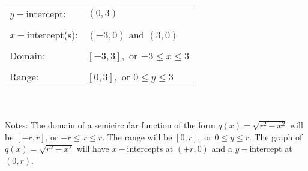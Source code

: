 \documentclass[12pt]{book}
\theoremstyle{definition}
\begin{document}
\vspace{0.5in}
\begin{tabular}{ll}
$y-$intercept: & $(0,3)$\\
&\\
$x-$intercept(s): & $(-3,0)$ and $(3,0)$\\
&\\
Domain: & $[-3,3],$ or $-3\leq x\leq 3$\\
&\\
Range: & $[0,3],$ or $0\leq y\leq 3$
\end{tabular}
\\
~\\

Notes: The domain of a semicircular function of the form $q(x)=\sqrt{r^2-x^2}$ will be $[-r,r]$, or $-r\leq x\leq r$.  The range will be $[0,r],$ or $0\leq y\leq r$.  The graph of $q(x)=\sqrt{r^2-x^2}$ will have $x-$intercepts at $(\pm r,0)$ and a $y-$intercept at $(0,r)$. 

\newpage
\end{document}
